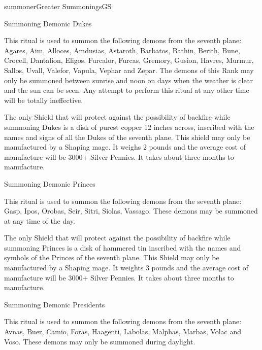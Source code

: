 \begin{college}[1.0]{summoner}{Greater Summonings}{GS}
\begin{ritual}[R-1]{Summoning Demonic Dukes}

\begin{effects}
This ritual is used to summon the following demons from the seventh
plane: Agares, Aim, Alloces, Amdusias, Astaroth, Barbatos, Bathin,
Berith, Bune, Crocell, Dantalion, Eligos, Furcalor, Furcas, Gremory,
Gusion, Havres, Murmur, Sallos, Uvall, Valefor, Vapula, Vephar and
Zepar.  The demons of this Rank may only be summoned between sunrise
and noon on days when the weather is clear and the sun can be seen.
Any attempt to perform this ritual at any other time will be totally
ineffective.

The only Shield that will protect against the possibility of backfire
while summoning Dukes is a disk of purest copper 12 inches across,
inscribed with the names and signs of all the Dukes of the seventh
plane.  This shield may only be manufactured by a Shaping mage. It
weighs 2 pounds and the average cost of manufacture will be 3000+
Silver Pennies. It takes about three months to manufacture.
\end{effects}
\end{ritual}

\begin{ritual}[R-2]{Summoning Demonic Princes}

\begin{effects}
This ritual is used to summon the following demons from the seventh
plane: Gasp, Ipos, Orobas, Seir, Sitri, Siolas, Vassago.  These demons
may be summoned at any time of the day.

The only Shield that will protect against the possibility of backfire
while summoning Princes is a disk of hammered tin inscribed with
the names and symbols of the Princes of the seventh plane.  This
Shield may only be manufactured by a Shaping mage.  It weights 3
pounds and the average cost of manufacture will be 3000+ Silver
Pennies.  It takes about three months to manufacture.
\end{effects}
\end{ritual}

\begin{ritual}[R-3]{Summoning Demonic Presidents}

\begin{effects}
This ritual is used to summon the following demons from the seventh
plane: Avnas, Buer, Camio, Foras, Haagenti, Labolas, Malphas, Marbas,
Volac and Voso.  These demons may only be summoned during daylight.


\end{effects}
\end{ritual}
\end{college}
